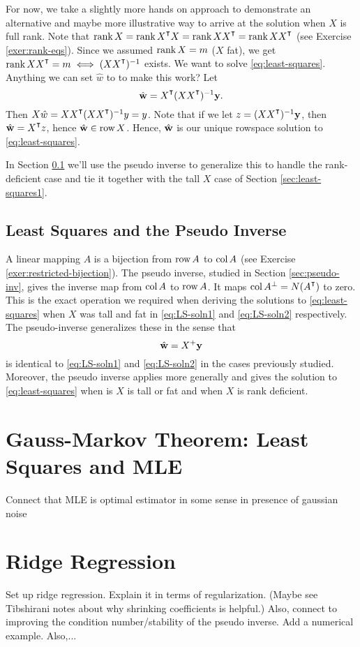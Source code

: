 For now, we take a slightly more hands on approach to demonstrate an alternative and maybe more illustrative way to arrive at the solution when $X$ is full rank. Note that $\myrank X = \myrank X^\T X = \myrank X X^\T = \myrank X X^\T$ (see Exercise \ref{exer:rank-eqs}). 
Since we assumed $\textup{rank}\, X = m$ ($X$ fat), we get $\myrank X X^\T = m \iff (X X^\T)^{-1}$ exists. We want to solve \eqref{eq:least-squares}. Anything we can set $\hat w$ to to make this work? 
Let 
\begin{equation}\label{eq:LS-soln2}
\hat \w = X^\T (X X^\T)^{-1}\y.
\end{equation}
Then $X\hat w = XX^\T (X X^\T)^{-1} y = y$. 
Note that if we let $z = (XX^\T)^{-1}\y$, then $\hat \w = X^\T z$, hence $\hat {{ \bf w}} \in \text{row}\, X$. 
Hence, $\hat {{ \bf w}}$ is our unique rowspace solution to \eqref{eq:least-squares}. 

In Section \ref{sec:LSQ-pseudo-inv} we'll use the pseudo inverse to generalize this to handle the rank-deficient case and tie it together with the tall $X$ case of Section \eqref{sec:least-squares1}.


\subsection{Least Squares and the Pseudo Inverse} \label{sec:LSQ-pseudo-inv}
A linear mapping $A$ is a bijection from $\text{row}\, A$ to $\text{col}\, A$ (see Exercise \ref{exer:restricted-bijection}). The pseudo inverse, studied in Section \ref{sec:pseudo-inv}, gives the inverse map from $\text{col}\, A$ to $\text{row}\, A$. It maps $\col A^{\perp} = N(A^\T)$ to zero. This is the exact operation we required when deriving the solutions to \eqref{eq:least-squares} when $X$ was tall and fat in \eqref{eq:LS-soln1} and \eqref{eq:LS-soln2} respectively. The pseudo-inverse generalizes these in the sense that 
$$
\hat {{ \bf w}} = X^+{\bf y}
$$
is identical to \eqref{eq:LS-soln1} and \eqref{eq:LS-soln2}  in the cases previously studied. Moreover, the pseudo inverse applies more generally and gives the solution to \eqref{eq:least-squares} when is $X$ is tall or fat and when $X$ is rank deficient. 

\section{Gauss-Markov Theorem: Least Squares and MLE} \label{sec:Gauss-Markov}
 Connect that MLE is optimal estimator in some sense in presence of gaussian noise

\section{Ridge Regression}
 Set up ridge regression. Explain it in terms of regularization. (Maybe see Tibshirani notes about why shrinking coefficients is helpful.) Also, connect to improving the condition number/stability of the pseudo inverse. Add a numerical example. Also,...\\

